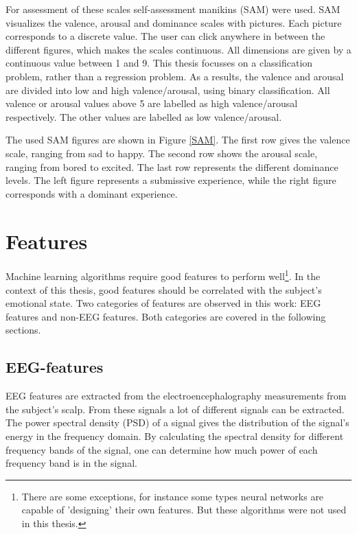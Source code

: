 \npar

For assessment of these scales self-assessment manikins (SAM) were used\cite{DEAP}. SAM visualizes the valence, arousal and dominance scales with pictures. Each picture corresponds to a discrete value. The user can click anywhere in between the different figures, which makes the scales continuous. All dimensions are given by a continuous value between 1 and 9. This thesis focusses on a classification problem, rather than a regression problem. As a results, the valence and arousal are divided into low and high valence/arousal, using binary classification. All valence or arousal values above 5 are labelled as high valence/arousal respectively. The other values are labelled as low valence/arousal.

\clearpage

The used SAM figures are shown in Figure \ref{SAM}. The first row gives the valence scale, ranging from sad to happy. The second row shows the arousal scale, ranging from bored to excited. The last row represents the different dominance levels. The left figure represents a submissive experience, while the right figure corresponds with a dominant experience.


\section{Features}
\label{featuresExplained}
Machine learning algorithms require good features to perform well\footnote{There are some exceptions, for instance some types neural networks are capable of 'designing' their own features\citep{nnfeat}. But these algorithms were not used in this thesis.}. In the context of this thesis, good features should be correlated with the subject's emotional state. Two categories of features are observed in this work: EEG features and non-EEG features. Both categories are covered in the following sections.

\subsection{EEG-features}
EEG features are extracted from the electroencephalography measurements from the subject's scalp. From these signals a lot of different signals can be extracted. The power spectral density (PSD)  of a signal gives the distribution of the signal's energy in the frequency domain. By calculating the spectral density for different frequency bands of the signal, one can determine how much power of each frequency band is in the signal.

